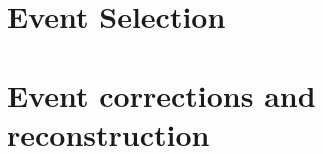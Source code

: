 \documentclass[a4paper,12pt]{book}
\begin{document}
\chapter{Event Selection}
%

\chapter{Event corrections and reconstruction}
%
\end{document}
